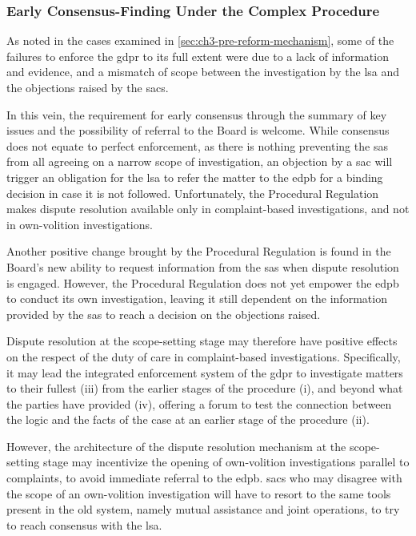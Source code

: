 \subsubsection{Early Consensus-Finding Under the Complex Procedure}
\label{sec:ch4-early-consensus-finding}

As noted in the cases examined in \cref{sec:ch3-pre-reform-mechanism}, some of the failures to enforce the \gls{gdpr} to its full extent were due to a lack of information and evidence, and a mismatch of scope between the investigation by the \gls{lsa} and the objections raised by the \glspl{sac}.

In this vein, the requirement for early consensus through the summary of key issues and the possibility of referral to the Board is welcome.\autocite[44]{edpbJointOpinion012023}
While consensus does not equate to perfect enforcement, as there is nothing preventing the \glspl{sa} from all agreeing on a narrow scope of investigation, an objection by a \gls{sac} will trigger an obligation for the \gls{lsa} to refer the matter to the \gls{edpb} for a binding decision in case it is not followed.\autocite[11(6)]{ProceduralRegulation}
Unfortunately, the Procedural Regulation makes dispute resolution available only in complaint-based investigations, and not in own-volition investigations.\autocite[11(6)]{ProceduralRegulation}

Another positive change brought by the Procedural Regulation is found in the Board's new ability to request information from the \glspl{sa} when dispute resolution is engaged.
However, the Procedural Regulation does not yet empower the \gls{edpb} to conduct its own investigation, leaving it still dependent on the information provided by the \glspl{sa} to reach a decision on the objections raised.

Dispute resolution at the scope-setting stage may therefore have positive effects on the respect of the duty of care in complaint-based investigations. 
Specifically, it may lead the integrated enforcement system of the \gls{gdpr} to investigate matters to their fullest (iii) from the earlier stages of the procedure (i), and beyond what the parties have provided (iv), offering a forum to test the connection between the logic and the facts of the case at an earlier stage of the procedure (ii).

However, the architecture of the dispute resolution mechanism at the scope-setting stage may incentivize the opening of own-volition investigations parallel to complaints, to avoid immediate referral to the \gls{edpb}.\autocite[505]{mustertProceduralisingEnforcement2026}
\glspl{sac} who may disagree with the scope of an own-volition investigation will have to resort to the same tools present in the old system, namely mutual assistance and joint operations, to try to reach consensus with the \gls{lsa}.\autocite[505]{mustertProceduralisingEnforcement2026}

